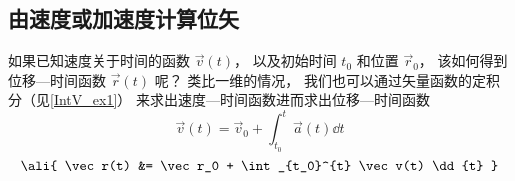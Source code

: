 \subsection{由速度或加速度计算位矢}

如果已知速度关于时间的函数 $\vec v(t)$， 以及初始时间 $t_0$ 和位置 $\vec r_0$， 该如何得到位移—时间函数 $\vec r(t)$ 呢？ 类比一维的情况， 我们也可以通过矢量函数的定积分（见\autoref{IntV_ex1}） 来求出速度—时间函数进而求出位移—时间函数
\begin{equation}\label{VnA_eq7}
\vec v(t) = \vec v_0 + \int_{t_0}^{t} \vec a(t) \dd{t}
\end{equation}
\begin{equation}\label{VnA_eq8}\ali{
\vec r(t) &= \vec r_0 + \int_{t_0}^{t} \vec v(t) \dd{t}
}\end{equation}










